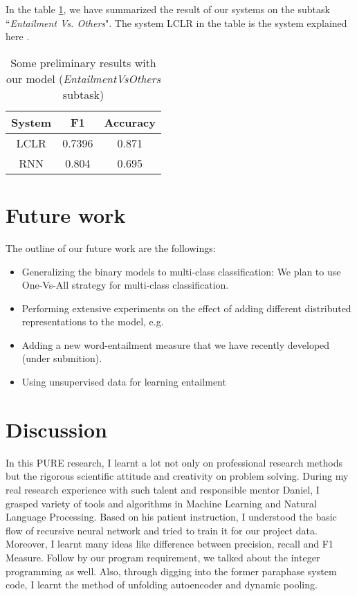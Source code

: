 \documentclass[12pt]{article}
\begin{document}
In the table \ref{tab:entrailmentVsOthers}, we have summarized the result of our systems on the subtask ``\textit{Entailment Vs. Others}". The system LCLR in the table is the system explained here \cite{chang2010discriminative}. 

\begin{table}
\centering
\begin{tabular}{|c|c|c|}
\hline 
System & F1 & Accuracy \\ 
\hline
\hline 
LCLR  &  0.7396  &   0.871  \\ 
\hline	
RNN &  0.804 &  0.695 \\ 
\hline 
\end{tabular}
\caption{Some preliminary results with our model (\textit{EntailmentVsOthers} subtask)}
\label{tab:entrailmentVsOthers}
\end{table}


\section{Future work}
The outline of our future work are the followings: 
\begin{itemize}
\item Generalizing the binary models to multi-class classification: We plan to use One-Vs-All strategy for multi-class classification. 
\item Performing extensive experiments on the effect of adding different distributed representations to the model, e.g. \cite{gabrilovich2007computing,mikolov2010recurrent} 
\item Adding a new word-entailment measure that we have recently developed (under submition). 
\item Using unsupervised data for learning entailment
\end{itemize}


\section{Discussion}
In this PURE research, I learnt a lot not only on professional research methods but the rigorous scientific attitude  and creativity on problem solving. During my real research experience with such talent and responsible mentor Daniel, I grasped variety of tools and algorithms in Machine Learning and Natural Language Processing. Based on his patient instruction, I understood the basic flow of recursive neural network and tried to train it for our project data. Moreover, I learnt many ideas like difference between precision, recall and F1 Measure. Follow by our program requirement, we talked about the integer programming as well.  Also, through digging into the former paraphase system code, I learnt the method of unfolding autoencoder and dynamic pooling. 


	
\end{document}
